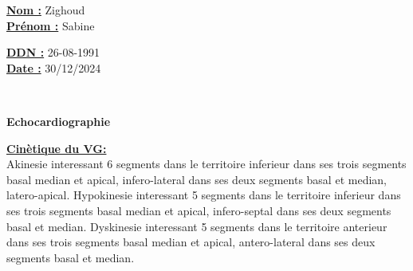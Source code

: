 \documentclass[12pt,a4paper]{article}%
\begin{document}
%
\normalsize%
\begin{minipage}{0.5\linewidth}%
\textbf{\underline{Nom :}} \hspace{1cm} Zighoud%
\\%
\textbf{\underline{Prénom :}} \hspace{1cm} Sabine%
\\%
\end{minipage}%
\begin{minipage}{0.5\linewidth}%
\textbf{\underline{DDN :}} \hspace{1cm} 26-08-1991%
\\%
\textbf{\underline{Date :}} \hspace{1cm} 30/12/2024%
\\%
\end{minipage}%
\hspace{\textwidth}%
\\%
\begin{center}%

        \begin{tcolorbox}[
            colframe=main_title_border_color,        %
            colback=main_title_background_color,        %
            coltitle=main_title_border_color,       %
            arc=8pt,              %
            boxrule=0.5mm,          %
            auto outer arc,       %
            width=\linewidth,     %
            halign=center         %
        ]
        \LARGE{\textbf{Echocardiographie}}
        \end{tcolorbox}
\end{center}%
%
\vspace*{\baselineskip}%
\textbf{\ul{Cinètique du VG:}}%
\\%
Akinesie interessant 6 segments dans le territoire inferieur dans ses trois segments basal median et apical, infero{-}lateral dans ses deux segments basal et median, latero{-}apical. Hypokinesie interessant 5 segments dans le territoire inferieur dans ses trois segments basal median et apical, infero{-}septal dans ses deux segments basal et median. Dyskinesie interessant 5 segments dans le territoire anterieur dans ses trois segments basal median et apical, antero{-}lateral dans ses deux segments basal et median.%
\\%
\\%
\end{document}

